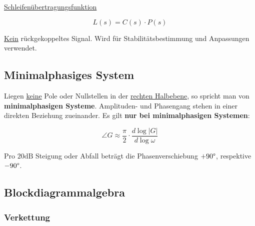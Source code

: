 \documentclass[
  10pt,
  a4paper,
]{article}
\numberwithin{equation}{section}
\begin{document}
\begin{multicols}{2}
\begin{center}
\end{center}

\underline{\footnotesize{Schleifenübertragungsfunktion}}

\[
L(s) = C(s)\cdot P(s)
\]

\ul{Kein} rückgekoppeltes Signal. Wird für Stabilitätsbestimmung und
Anpassungen verwendet.

\hypertarget{minimalphasiges-system}{%
\subsection{Minimalphasiges System}\label{minimalphasiges-system}}

Liegen \ul{keine} Pole oder Nullstellen in der \ul{rechten Halbebene},
so spricht man von \textbf{minimalphasigen Systeme}. Amplituden- und
Phasengang stehen in einer direkten Beziehung zueinander. Es gilt
\textbf{nur bei minimalphasigen Systemen}:

\[
\angle{G}\approx\frac{\pi}{2}\cdot\frac{d{\log\lvert G\rvert}}{d{\log{\omega}}}
\]

Pro \(20\text{dB}\) Steigung oder Abfall beträgt die Phasenverschiebung
\(+90\degree\), respektive \(-90\degree\).

\hypertarget{blockdiagrammalgebra}{%
\subsection{Blockdiagrammalgebra}\label{blockdiagrammalgebra}}

\hypertarget{verkettung}{%
\subsubsection{Verkettung}\label{verkettung}}

\begin{center}
\end{center}
\end{multicols}
\end{document}
